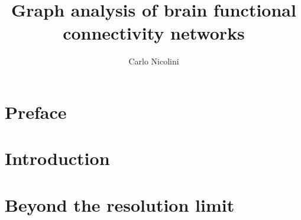 
%

\title{Graph analysis of brain functional connectivity networks}
\author{Carlo Nicolini}


\maketitle
{}

%

%


\chapter*{Preface}\label{chap:preface}




\chapter{Introduction}\label{chap:introduction}
	

\chapter{Beyond the resolution limit}\label{chap:surprise}
	
% 	

% 	

